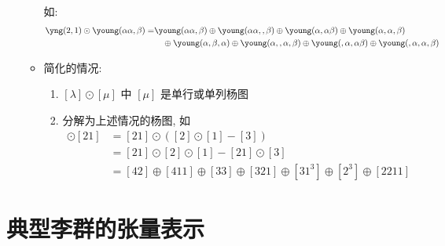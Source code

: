 \documentclass[12pt,a4paper]{article}%
\numberwithin{equation}{section}%
\begin{document}
\begin{enumerate}
\begin{itemize}
\begin{itemize}
		\end{itemize}
		如: 
		\begin{align*}
			\yng(2,1)\odot\young(\alpha\alpha,\beta) = &
			\young(\hfil\hfil\alpha\alpha,\hfil\beta) 
			\oplus \young(\hfil\hfil\alpha\alpha,\hfil,\beta)
			\oplus \young(\hfil\hfil\alpha,\hfil\alpha\beta) 
			\oplus \young(\hfil\hfil\alpha,\hfil\alpha,\beta) \\
			&\quad \oplus \young(\hfil\hfil\alpha,\hfil\beta,\alpha) 
			\oplus \young(\hfil\hfil\alpha,\hfil,\alpha,\beta) 
			\oplus \young(\hfil\hfil,\hfil\alpha,\alpha\beta)
			\oplus \young(\hfil\hfil,\hfil\alpha,\alpha,\beta)
		\end{align*}
		\item 简化的情况: 
		\begin{enumerate}
			\item $[\lambda]\odot[\mu]$ 中 $[\mu]$ 是单行或单列杨图
			\item 分解为上述情况的杨图, 如
			\begin{align*}
				[21]\odot[21] &= [21]\odot([2]\odot[1] - [3]) \\
				&= [21]\odot[2]\odot[1] - [21]\odot[3] \\
				&= [42]\oplus[411]\oplus[33]\oplus[321]\oplus[31^3]\oplus[2^3]\oplus[2211]
			\end{align*}
		\end{enumerate}
	\end{itemize}
\end{enumerate}
\section{典型李群的张量表示} %
\label{sec:classic_lie}
\end{document}
